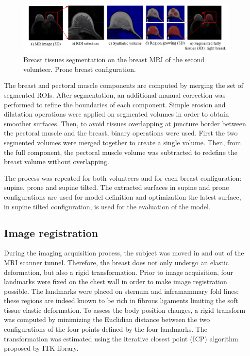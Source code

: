  
 \begin{figure}[h]
\centering
\includegraphics[width=1\textwidth,keepaspectratio]{figures/tissues_segmentation.png} 
\caption{Breast tissues segmentation on the breast MRI of the second volunteer. Prone breast configuration.} \label{fig:breasttissuessegmentation}
\end{figure}

The breast and pectoral muscle components are computed by merging the set of segmented ROIs. After segmentation, an additional manual correction was performed to refine the boundaries of each component. Simple erosion and dilatation operations were applied on segmented volumes in order to obtain smoother surfaces. Then, to avoid tissues overlapping at juncture border between the pectoral muscle and the breast, binary operations were used. First the two segmented volumes were merged together to create a single volume. Then, from the full component, the pectoral muscle volume was subtracted to redefine the breast volume without overlapping.
 
The process was repeated for both volunteers and for each breast configuration: supine, prone and supine tilted. The extracted surfaces in supine and prone configurations are used for model definition and optimization the latest surface, in supine tilted configuration, is used for the evaluation of the model. 

\subsection{Image registration}\label{subsection:image registration}

During the imaging acquisition process, the subject was moved in and out of the MRI scanner tunnel. Therefore, the breast does not only undergo an elastic deformation, but also a rigid transformation. Prior to image acquisition, four landmarks were fixed on the chest wall in order to make image registration possible.  The landmarks were placed on sternum and inframammary fold lines; these regions are indeed known to be rich in fibrous ligaments limiting the soft tissue elastic deformation.  To assess the body position changes, a rigid transform was computed by minimizing the Euclidian distance between the two configurations of the four points defined by the four landmarks. The transformation was estimated using the iterative closest point (ICP) algorithm proposed by ITK library.

